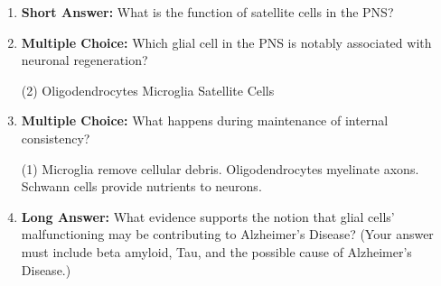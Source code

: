 \begin{enumerate}[label=\textbf{Q2.1.\arabic*}]
      \item \textbf{Short Answer:} What is the function of satellite cells in the PNS? \\

      \item \textbf{Multiple Choice:} Which glial cell in the PNS is notably associated with neuronal regeneration?
            \begin{tasks}[label=\textcolor{draculafg}{(\Alph*)}, item-format=\color{draculafg}, label-width=1.5em, item-indent=1.7em](2)
                  \task Oligodendrocytes
                  \task Microglia
                  \task Satellite Cells
                  \task {}
            \end{tasks}

      \item \textbf{Multiple Choice:} What happens during maintenance of internal consistency?
            \begin{tasks}[label=\textcolor{draculafg}{(\Alph*)}, item-format=\color{draculafg}, label-width=1.5em, item-indent=1.7em](1)
                  \task Microglia remove cellular debris.
                  \task Oligodendrocytes myelinate axons.
                  \task {}
                  \task Schwann cells provide nutrients to neurons.
            \end{tasks}
            
      \item \textbf{Long Answer:} What evidence supports the notion that glial cells' malfunctioning may be contributing to Alzheimer's Disease? (Your answer must include beta amyloid, Tau, and the possible cause of Alzheimer's Disease.) \\

\end{enumerate}
\newpage
\squigglyline

